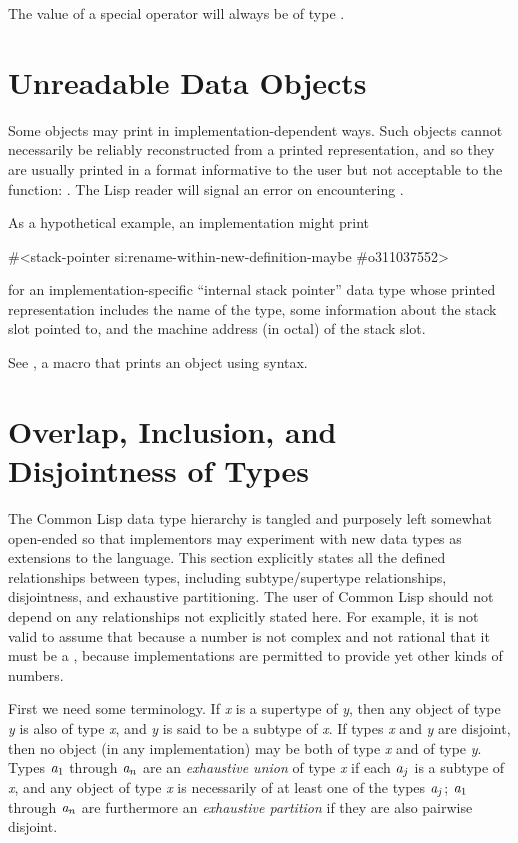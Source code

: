 The value of a  special operator
will always be of type .

\section{Unreadable Data Objects}

Some objects may print in implementation-dependent ways.
Such objects cannot necessarily be reliably reconstructed from
a printed representation, and so they are usually printed in
a format informative to the user but not acceptable to the  function:
.
The Lisp reader will signal an error on encountering \cd{\#<}.

As a hypothetical example, an implementation might print
\begin{lisp}
\#<stack-pointer si:rename-within-new-definition-maybe \#o311037552>
\end{lisp}
for an implementation-specific ``internal stack pointer'' data type
whose printed representation includes the name of the type,
some information about the stack slot pointed to, and the machine address
(in octal) of the stack slot.

See , a macro that prints an object using \cd{\#<}
syntax.

\section{Overlap, Inclusion, and Disjointness of Types}
\label{DATA-TYPE-RELATIONSHIPS}

The Common Lisp data type hierarchy is tangled and purposely left somewhat
open-ended so that implementors may experiment with new data types
as extensions to the language.  This section explicitly states all
the defined relationships between types, including subtype/supertype
relationships,
disjointness, and exhaustive partitioning.  The user of Common Lisp
should not depend on any relationships not explicitly stated here.
For example, it is not valid to assume that because a number
is not complex and not rational that it must be a , because
implementations are permitted to provide yet other kinds of numbers.

First we need some terminology.
If \emph{x} is a supertype of \emph{y}, then any object of type \emph{y} is also
of type \emph{x}, and \emph{y} is said to be a subtype of \emph{x}.  If types
\emph{x} and \emph{y} are disjoint, then no object (in any implementation) may
be both of type \emph{x} and of type \emph{y}.  Types $\emph{a}_1$ through
$\emph{a}_{n}$ are an \emph{exhaustive union}
of type \emph{x} if each $\emph{a}_j$
is a subtype of \emph{x}, and any object of type \emph{x} is
necessarily of at least one of the types $\emph{a}_{j}$;
$\emph{a}_1$ through $\emph{a}_{n}$ are furthermore an \emph{exhaustive partition}
if they are also pairwise disjoint.

